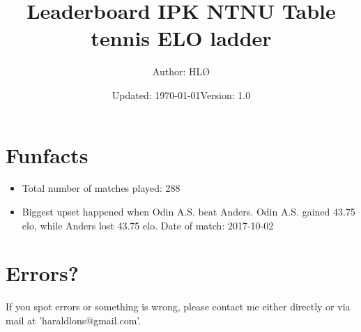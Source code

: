 \documentclass[11pt]{article}
\newcommand\tab[1][1cm]{\hspace*{#1}}
\begin{document}
\title{\textbf{Leaderboard IPK NTNU Table tennis ELO ladder }}
\author{Author: HLØ}
\date{Updated: \today\tab Version: 1.0}

\maketitle


\makeatletter


\section*{Funfacts}
\begin{itemize}
    \item Total number of matches played: 288
    \item Biggest upset happened when Odin A.S. beat Anders. Odin A.S. gained 43.75 elo, while Anders lost 43.75 elo. Date of match: 2017-10-02
\end{itemize}
\section*{Errors?}
If you spot errors or something is wrong, please contact me either directly or via mail at 'haraldlons@gmail.com'.
\end{document}
